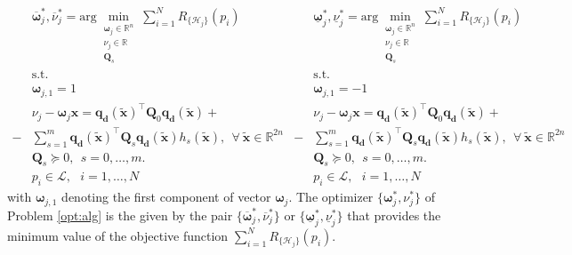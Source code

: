 \documentclass[twocolumn]{autart}
\newcommand{\tr}{\mbox{\tiny T}} %
\newcommand{\DP}[1]{{#1}}
\newcommand{\xaug}{\tilde{\mathbf{x}}}
\newcommand{\relorder}{\DP{\mathbf{d}}}
\begin{document}
 \begin{subequations} \label{opt:algappSDPsplit}
 \begin{equation}
   \begin{split}
&\overline{\boldsymbol{\omega}}^*_j,\overline{\nu}^*_j=  \mbox{arg}\min_{\substack{     \boldsymbol{\omega}_j \in \mathbb{R}^n \\
                                            \nu_j \in \mathbb{R} \\
                                            \mathbf{Q}_s   }} \sum_{i=1}^N R_{\{\mathcal{H}_j\}}(p_i) \\
   & \mbox{s.t. } \\
   &  \boldsymbol{\omega}_{j,1} =1 \\
    & \nu_j - \boldsymbol{\omega}_j \mathbf{x}=    \mathbf{q}_\relorder(\xaug)^\top \mathbf{Q}_0 \mathbf{q}_\relorder(\xaug)+\\
   -& \sum_{s=1}^m \mathbf{q}_\relorder(\xaug)^\top \mathbf{Q}_s \mathbf{q}_\relorder(\xaug) h_s(\xaug), ~~\forall~\xaug \in \mathbb{R}^{2n}\\
  & \mathbf{Q}_s \succeq 0, \ \ s=0,\ldots,m. \\
   & p_i \in \mathcal{L}, \ \ \ i=1,\ldots,N
  \end{split}
 \end{equation}
  \begin{equation}
   \begin{split}
&\underline{\boldsymbol{\omega}}^*_j,\underline{\nu}^*_j=  \mbox{arg}\min_{\substack{     \boldsymbol{\omega}_j \in \mathbb{R}^n \\
                                            \nu_j \in \mathbb{R} \\
                                            \mathbf{Q}_s  }} \sum_{i=1}^N R_{\{\mathcal{H}_j\}}(p_i) \\
   & \mbox{s.t. } \\
   &  \boldsymbol{\omega}_{j,1} =-1 \\
    & \nu_j - \boldsymbol{\omega}_j \mathbf{x}=    \mathbf{q}_\relorder(\xaug)^\top \mathbf{Q}_0 \mathbf{q}_\relorder(\xaug)+\\
   -& \sum_{s=1}^m \mathbf{q}_\relorder(\xaug)^\top \mathbf{Q}_s \mathbf{q}_\relorder(\xaug) h_s(\xaug), ~~\forall~\xaug \in \mathbb{R}^{2n}\\
  & \mathbf{Q}_s \succeq 0, \ \ s=0,\ldots,m. \\
   & p_i \in \mathcal{L}, \ \ \ i=1,\ldots,N
  \end{split}
 \end{equation}
 \end{subequations}
 with $\boldsymbol{\omega}_{j,1}$ denoting the first component of vector $\boldsymbol{\omega}_j$. The optimizer $\{\boldsymbol{\omega}^*_j,\nu^*_j\}$ of Problem  \eqref{opt:alg} is the given by the pair  $\{\overline{\boldsymbol{\omega}}^*_j,\overline{\nu}^*_j\}$ or  $\{\underline{\boldsymbol{\omega}}^*_j,\underline{\nu}^*_j\}$ that provides the minimum value of the objective function $\sum_{i=1}^N R_{\{\mathcal{H}_j\}}(p_i)$.
\end{document}
